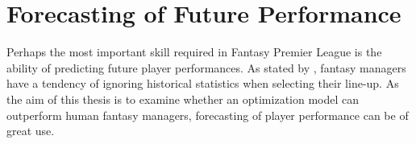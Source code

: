 \begin{comment}
There is limited research available on optimization of a Fantasy Premier League team. However, due to the large amount of active NFL Fantasy Sports players, literature is available for both season- and weekly format. \cite{King} suggested a model for predicting points for the quarterbacks in the NFL, using Backward Stepwise regression and Support Vector regression models in his research. Further, he predicted fantasy points by use of Artificial Neural Networks. Similar approaches can be used in order to predict the performance of the Premier League players.
\end{comment}


\section{Forecasting of Future Performance}
Perhaps the most important skill required in Fantasy Premier League is the ability of predicting future player performances. As stated by \cite{Smith}, fantasy managers have a tendency of ignoring historical statistics when selecting their line-up. As the aim of this thesis is to examine whether an optimization model can outperform human fantasy managers, forecasting of player performance can be of great use. 
